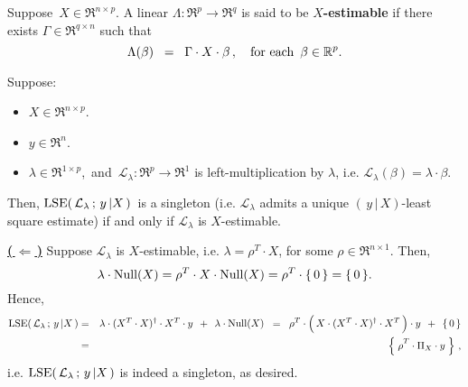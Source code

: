 \begin{definition}
\mbox{}\vskip 0.1cm\noindent
Suppose \,$X \in \Re^{n \times p}$.
A linear $\Lambda : \Re^{p} \longrightarrow \Re^{q}$ is said to be \textbf{$X$-estimable}
if there exists $\Gamma \in \Re^{q \times n}$ such that
\begin{equation*}
\Lambda(\beta) \;\; =\;\; \Gamma \cdot X \cdot \beta\,,
\quad
\textnormal{for each \,$\beta \in \Re^{p}$}.
\end{equation*}
\end{definition}

\begin{theorem}
\mbox{}\vskip 0.1cm\noindent
Suppose:
\begin{itemize}
\item
	$X \in \Re^{n \times p}$.
\item
	$y \in \Re^{n}$.
\item
	$\lambda \in \Re^{1 \times p}$,\,
	and
	\,$\mathcal{L}_{\lambda} : \Re^{p} \longrightarrow \Re^{1}$ is left-multiplication by $\lambda$,
	i.e. $\mathcal{L}_{\lambda}(\beta) = \lambda \cdot \beta$.
\end{itemize}
Then,
	$\lse\!\left(\,\mathcal{L}_{\lambda} \,;\, y\,\vert X\,\right)$\,
	is a singleton (i.e. $\mathcal{L}_{\lambda}$ admits a unique $(\,y\,\vert\,X)$-least square estimate)
	if and only if $\mathcal{L}_{\lambda}$ is $X$-estimable.
\end{theorem}
\proof
\vskip 0.2cm\noindent
\underline{\textbf{(\,$\Longleftarrow$\,)}}\quad
Suppose $\mathcal{L}_{\lambda}$ is $X$-estimable, i.e. $\lambda = \rho^{T} \cdot X$,
for some $\rho \in \Re^{n \times 1}$.
Then,
\begin{equation*}
\lambda\cdot\Null(X) = \rho^{T} \cdot X \cdot \Null(X) = \rho^{T} \cdot \{\,0\,\} = \{\,0\,\}.
\end{equation*}
Hence,
\begin{eqnarray*}
\lse\!\left(\,\mathcal{L}_{\lambda} \,;\, y\,\vert X\,\right)
&=&
	\lambda \cdot (X^{T} \cdot X)^{\dagger} \cdot X^{T} \cdot y \;\, + \;\, \lambda \cdot \Null(X)
\;\;=\;\;
	\rho^{T} \cdot \left(\,\overset{{\color{white}.}}{X} \cdot (X^{T} \cdot X)^{\dagger} \cdot X^{T}\,\right) \cdot y \;\, + \;\, \{\,0\,\}
\\
&=&
	\left\{\; \overset{{\color{white}.}}{\rho}^{T} \cdot \Pi_{X} \cdot y \;\right\}\,,
\end{eqnarray*}
i.e. $\lse\!\left(\,\mathcal{L}_{\lambda} \,;\, y\,\vert X\,\right)$ is indeed a singleton, as desired.

